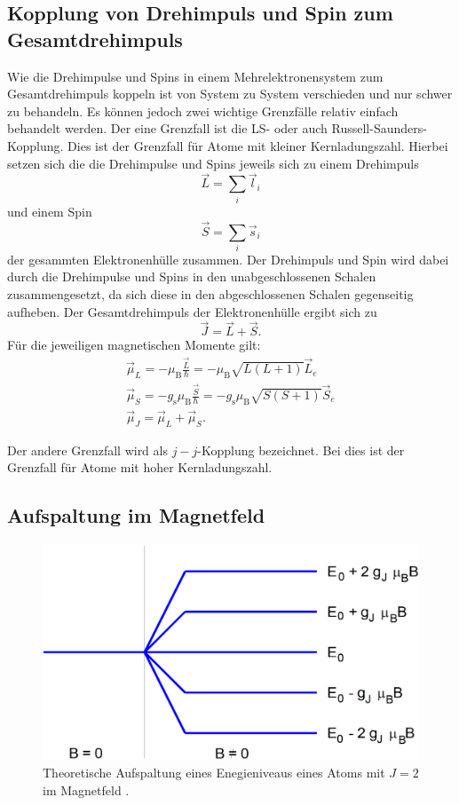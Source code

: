 \subsection{Kopplung von Drehimpuls und Spin zum Gesamtdrehimpuls}

Wie die Drehimpulse und Spins in einem Mehrelektronensystem zum Gesamtdrehimpuls koppeln ist von System zu System verschieden und nur schwer zu behandeln. Es können jedoch zwei wichtige Grenzfälle relativ einfach behandelt werden. Der eine Grenzfall ist die LS- oder auch Russell-Saunders-Kopplung. Dies ist der Grenzfall für Atome mit kleiner Kernladungszahl. Hierbei setzen sich die die Drehimpulse und Spins jeweils sich zu einem Drehimpuls \[\vec{L}=\sum_i \vec{l}_i\] und einem Spin \[\vec{S}=\sum_i \vec{s}_i\] der gesammten Elektronenhülle zusammen. Der Drehimpuls und Spin wird dabei durch die Drehimpulse und Spins in den unabgeschlossenen Schalen zusammengesetzt, da sich diese in den abgeschlossenen Schalen gegenseitig aufheben. Der Gesamtdrehimpuls der Elektronenhülle ergibt sich zu \[\vec{J}=\vec{L}+\vec{S}.\] Für die jeweiligen magnetischen Momente gilt:
\begin{gather*}
	\vec{\mu}_L=-  \mu_\text{B} \frac{\vec{L}}{\hbar}=- \mu_\text{B} \sqrt{L(L+1)} \vec{L}_e\\
	\vec{\mu}_S=- g_\text{s} \mu_\text{B} \frac{\vec{S}}{\hbar}=- g_\text{s} \mu_\text{B} \sqrt{S(S+1)} \vec{S}_e\\
	\vec{\mu}_J=\vec{\mu}_L+\vec{\mu}_S.
\end{gather*}

Der andere Grenzfall wird als $j-j$-Kopplung bezeichnet. Bei dies ist der Grenzfall für Atome mit hoher Kernladungszahl.



\subsection{Aufspaltung im Magnetfeld}
\begin{figure}
	\centering
	\includegraphics[width=\linewidth-250pt,height=\textheight-250pt,keepaspectratio]{content/Images/generelleAufspaltung.png}
    \caption{Theoretische Aufspaltung eines Enegieniveaus eines Atoms mit $J=2$ im Magnetfeld \cite{V27}.}
    \label{fig:aborb}
\end{figure}
